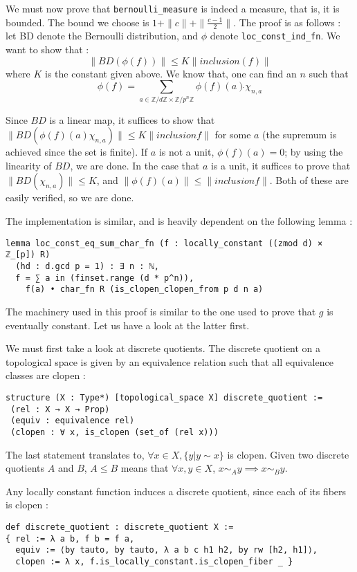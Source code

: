 \documentclass[a4paper,UKenglish,cleveref, autoref, thm-restate]{lipics-v2021}
\newcommand{\lean}[1]{\texttt{#1}\xspace} %
\begin{document}
We must now prove that \lean{bernoulli\_measure} is indeed a measure, that is, it is bounded. The bound we choose is 
$1 + \parallel c \parallel + \parallel \frac{c - 1}{2} \parallel$. The proof is as follows : let BD denote the Bernoulli 
distribution, and $\phi$ denote \lean{loc\_const\_ind\_fn}. We want to show that : 
$$ \parallel BD (\phi (f)) \parallel \le K \parallel inclusion (f) \parallel $$
where $K$ is the constant given above. We know that, one can find an $n$ such that 
$$\phi (f) = \sum_{a \in \mathbb{Z}/d \mathbb{Z} \times \mathbb{Z} /p^n \mathbb{Z}} \phi(f) (a) \dot{} \chi_{n,a}$$

Since $BD$ is a linear map, it suffices to show that 
$\parallel BD (\phi (f)(a) \chi_{n, a}) \parallel \le K \parallel inclusion f \parallel$ for some $a$ (the supremum is achieved 
since the set is finite). If $a$ is not a unit, $\phi (f) (a) = 0$; by using the linearity of $BD$, we are done. 
In the case that $a$ is a unit, it suffices to prove that $\parallel BD(\chi_{n, a}) \parallel \le K$, and 
$\parallel \phi (f) (a) \parallel \le \parallel inclusion f \parallel$. Both of these are easily verified, so we are done. 

The implementation is similar, and is heavily dependent on the following lemma : 
\begin{lstlisting}
lemma loc_const_eq_sum_char_fn (f : locally_constant ((zmod d) × ℤ_[p]) R) 
  (hd : d.gcd p = 1) : ∃ n : ℕ, 
  f = ∑ a in (finset.range (d * p^n)), 
    f(a) • char_fn R (is_clopen_clopen_from p d n a)
\end{lstlisting}

The machinery used in this proof is similar to the one used to prove that $g$ is eventually constant. Let us have a look at the latter first. 

We must first take a look at discrete quotients. The discrete quotient on a topological space is given by an equivalence relation such 
that all equivalence classes are clopen : 
\begin{lstlisting}
structure (X : Type*) [topological_space X] discrete_quotient :=
 (rel : X → X → Prop)
 (equiv : equivalence rel)
 (clopen : ∀ x, is_clopen (set_of (rel x)))
\end{lstlisting}

The last statement translates to, $\forall x \in X, \{ y | y \sim x \}$ is clopen. 
Given two discrete quotients $A$ and $B$, $A \le B$ means that $\forall x,y \in X$, 
$x \sim_{A} y \implies x \sim_{B} y$. 

Any locally constant function induces a discrete quotient, since each of its fibers is clopen : 
\begin{lstlisting}
def discrete_quotient : discrete_quotient X :=
{ rel := λ a b, f b = f a,
  equiv := ⟨by tauto, by tauto, λ a b c h1 h2, by rw [h2, h1]⟩,
  clopen := λ x, f.is_locally_constant.is_clopen_fiber _ }
\end{lstlisting}
\end{document}
